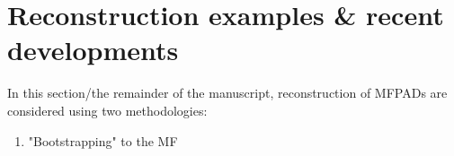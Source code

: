 \section{Reconstruction examples & recent developments}

In this section/the remainder of the manuscript, reconstruction of MFPADs are considered using two methodologies:

\begin{enumerate}
\item "Bootstrapping" to the MF

\end{enumerate}